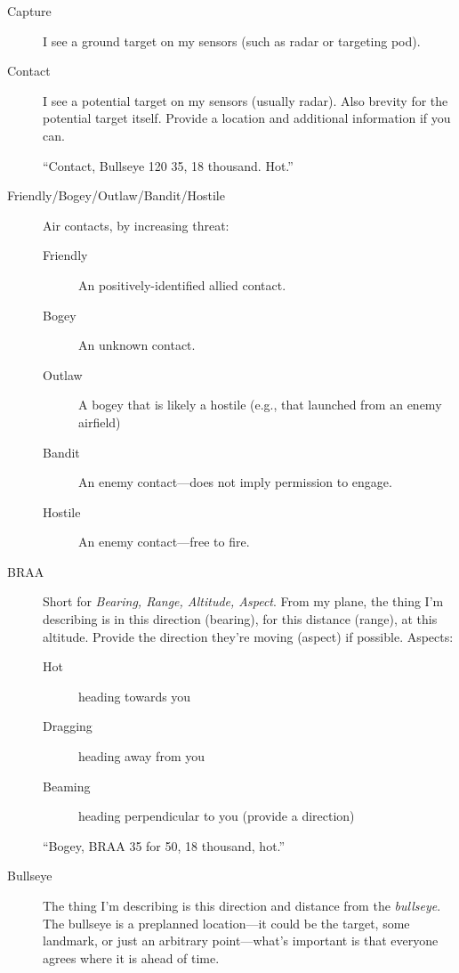 \begin{description}
\item[Capture] I see a ground target on my sensors (such as radar
    or targeting pod).

\item[Contact] I see a potential target on my sensors (usually radar).
    Also brevity for the potential target itself.
    Provide a location and additional information if you can.

    ``Contact, Bullseye 120 35, 18 thousand. Hot.''

\item[Friendly/Bogey/Outlaw/Bandit/Hostile]
    Air contacts, by increasing threat:
    \begin{description}
    \item[Friendly] An positively-identified allied contact.
    \item[Bogey] An unknown contact.
    \item[Outlaw] A bogey that is likely a hostile
        (e.g., that launched from an enemy airfield)
    \item[Bandit] An enemy contact---does not imply permission to engage.
    \item[Hostile] An enemy contact---free to fire.
    \end{description}

\item[BRAA] Short for \emph{Bearing, Range, Altitude, Aspect}.
    From my plane, the thing I'm describing is in this direction
    (bearing), for this distance (range), at this altitude.
    Provide the direction they're moving (aspect) if possible.
    Aspects:
    \begin{description}
    \item[Hot] heading towards you
    \item[Dragging] heading away from you
    \item[Beaming] heading perpendicular to you (provide a direction)
    \end{description}

    ``Bogey, BRAA 35 for 50, 18 thousand, hot.''

\item[Bullseye] The thing I'm describing is this direction and distance
    from the \emph{bullseye}.
    The bullseye is a preplanned location---it could be the target, some landmark,
    or just an arbitrary point---what's important is that everyone agrees where
    it is ahead of time.


\end{description}
